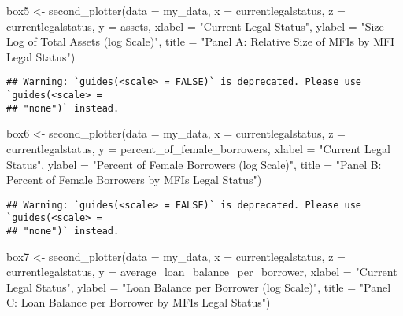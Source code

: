 \documentclass[a4paper,nobind]{templates/ociamthesis}
\newenvironment{Shaded}{\begin{snugshade}}{\end{snugshade}}
\newcommand{\AttributeTok}[1]{\textcolor[rgb]{0.77,0.63,0.00}{#1}}
\newcommand{\FunctionTok}[1]{\textcolor[rgb]{0.00,0.00,0.00}{#1}}
\newcommand{\NormalTok}[1]{#1}
\newcommand{\OtherTok}[1]{\textcolor[rgb]{0.56,0.35,0.01}{#1}}
\newcommand{\StringTok}[1]{\textcolor[rgb]{0.31,0.60,0.02}{#1}}
\renewenvironment{Shaded}
{
  \vspace{10pt}%
  \begin{snugshade}%
}{%
  \end{snugshade}%
  \vspace{8pt}%
}
\begin{document}
\newpage
\begin{landscape}

\begin{Shaded}
\begin{Highlighting}[]
\NormalTok{box5 }\OtherTok{\textless{}{-}} \FunctionTok{second\_plotter}\NormalTok{(}\AttributeTok{data =}\NormalTok{ my\_data, }\AttributeTok{x =}\NormalTok{ currentlegalstatus, }
        \AttributeTok{z =}\NormalTok{ currentlegalstatus,}
        \AttributeTok{y =}\NormalTok{ assets, }
        \AttributeTok{xlabel =} \StringTok{"Current Legal Status"}\NormalTok{, }
        \AttributeTok{ylabel =} \StringTok{"Size {-} Log of Total Assets (log Scale)"}\NormalTok{, }
        \AttributeTok{title =} \StringTok{"Panel A: Relative Size of MFIs by MFI Legal Status"}\NormalTok{)}
\end{Highlighting}
\end{Shaded}

\begin{verbatim}
## Warning: `guides(<scale> = FALSE)` is deprecated. Please use `guides(<scale> =
## "none")` instead.
\end{verbatim}

\begin{Shaded}
\begin{Highlighting}[]
\NormalTok{box6 }\OtherTok{\textless{}{-}} \FunctionTok{second\_plotter}\NormalTok{(}\AttributeTok{data =}\NormalTok{ my\_data, }\AttributeTok{x =}\NormalTok{ currentlegalstatus, }
        \AttributeTok{z =}\NormalTok{ currentlegalstatus,}
        \AttributeTok{y =}\NormalTok{ percent\_of\_female\_borrowers, }
        \AttributeTok{xlabel =} \StringTok{"Current Legal Status"}\NormalTok{, }
        \AttributeTok{ylabel =} \StringTok{"Percent of Female Borrowers (log Scale)"}\NormalTok{, }
        \AttributeTok{title =} \StringTok{"Panel B: Percent of Female Borrowers by MFIs Legal Status"}\NormalTok{)}
\end{Highlighting}
\end{Shaded}

\begin{verbatim}
## Warning: `guides(<scale> = FALSE)` is deprecated. Please use `guides(<scale> =
## "none")` instead.
\end{verbatim}

\begin{Shaded}
\begin{Highlighting}[]
\NormalTok{box7 }\OtherTok{\textless{}{-}} \FunctionTok{second\_plotter}\NormalTok{(}\AttributeTok{data =}\NormalTok{ my\_data, }\AttributeTok{x =}\NormalTok{ currentlegalstatus, }
        \AttributeTok{z =}\NormalTok{ currentlegalstatus,}
        \AttributeTok{y =}\NormalTok{ average\_loan\_balance\_per\_borrower, }
        \AttributeTok{xlabel =} \StringTok{"Current Legal Status"}\NormalTok{, }
        \AttributeTok{ylabel =} \StringTok{"Loan Balance per Borrower (log Scale)"}\NormalTok{, }
        \AttributeTok{title =} \StringTok{"Panel C: Loan Balance per Borrower by MFIs Legal Status"}\NormalTok{)}
\end{Highlighting}
\end{Shaded}


\end{landscape}
\end{document}
